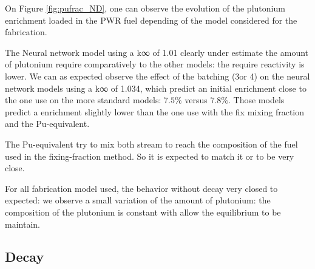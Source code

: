 \documentclass[10pt]{article}
\begin{document}
On Figure \ref{fig:pufrac_ND}, one can observe the evolution of the plutonium
enrichment loaded in the PWR fuel depending of the model considered for the
fabrication.

The Neural network model using a k∞ of 1.01 clearly under estimate the amount of
plutonium require comparatively to the other models: the require reactivity is
lower. We can as expected observe the effect of the batching (3or 4) on the
neural network models using a k∞ of 1.034, which predict an initial enrichment
close to the one use on the more standard models: $7.5\%$ versus $7.8\%$. Those
models predict a enrichment slightly lower than the one use with the fix mixing
fraction and the Pu-equivalent.

The Pu-equivalent try to mix both stream to reach the composition of the fuel
used in the fixing-fraction method. So it is expected to match it or to be very
close.

For all fabrication model used, the behavior without decay very closed to
expected: we observe a small variation of the amount of plutonium: the
composition of the plutonium is constant with allow the equilibrium to be
maintain. 


\subsection{Decay}
\end{document}
